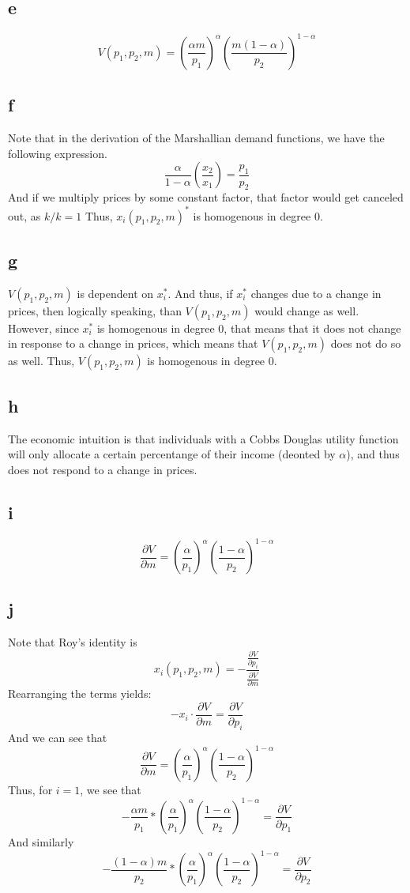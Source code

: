 \documentclass[12pt]{article}
\begin{document}
\subsection*{e}
\[
V(p_1,p_2,m) = \left(  \frac{\alpha m}{p_1} \right)^{\alpha} \left( \frac{m(1-\alpha)}{p_2}\right)^{1-\alpha}
\]
\subsection*{f}
Note that in the derivation of the Marshallian demand functions, we have the following expression. 
\[
    \frac{\alpha}{1-\alpha} \left( \frac{x_2}{x_1} \right) = \frac{p_1}{p_2}
\]
And if we multiply prices by some constant factor, that factor would get canceled out, as $k / k = 1$ Thus, $x_i(p_1,p_2,m)^*$ is homogenous in degree 0. 
\subsection*{g}
$V(p_1,p_2,m)$ is dependent on $x_i^*$. And thus, if $x^*_i$ changes due to a change in prices, then logically speaking, than $V(p_1, p_2, m)$ would change as well. However, since $x_i^*$ is homogenous in degree 0, that means that it does not change in response to a change in prices, which means that $V(p_1,p_2,m)$ does not do so as well. Thus, $V(p_1,p_2,m)$ is homogenous in degree 0.
\subsection*{h}
The economic intuition is that individuals with a Cobbs Douglas utility function will only allocate a certain percentange of their income (deonted by $\alpha$), and thus does not respond to a change in prices.
\subsection*{i}
\[
\frac{\partial V}{\partial m} = \left( \frac{\alpha}{p_1} \right)^{\alpha} \left( \frac{1-\alpha}{p_2} \right)^{1-\alpha}
\]
\subsection*{j}
Note that Roy's identity is 
\[
x_i(p_1, p_2, m) = -\frac{\frac{\partial V}{\partial p_i}}{\frac{\partial V}{\partial m}}
\]
Rearranging the terms yields:
\[
- x_i \cdot \frac{\partial V}{\partial m} = \frac{\partial V}{\partial p_i}
\]
And we can see that 
\[
\frac{\partial V}{\partial m} = \left( \frac{\alpha}{p_1} \right)^{\alpha} \left( \frac{1-\alpha}{p_2} \right)^{1-\alpha}
\]
Thus, for $i = 1$, we see that
\[
    -\frac{\alpha m}{p_1} *  \left( \frac{\alpha}{p_1} \right)^{\alpha} \left( \frac{1-\alpha}{p_2} \right)^{1-\alpha} = \frac{\partial V}{\partial p_1}
\]
And similarly 
\[
- \frac{(1-\alpha)m}{p_2} *  \left( \frac{\alpha}{p_1} \right)^{\alpha} \left( \frac{1-\alpha}{p_2} \right)^{1-\alpha} = \frac{\partial V}{\partial p_2}
\]
\end{document}
